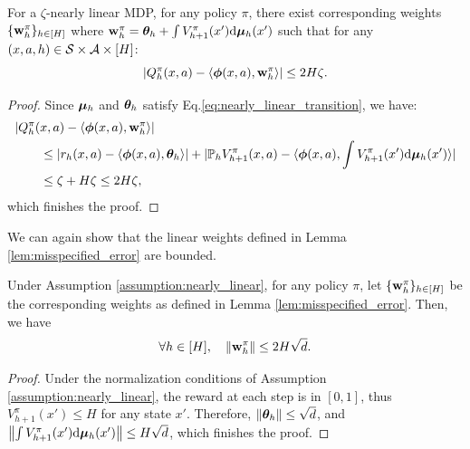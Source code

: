 \begin{lemma}\label{lem:misspecified_error}
For a $\zeta$-nearly linear MDP, for any policy $\pi$, there exist corresponding weights $\{\mathbf{w}^{\pi}_h\}_{h\in[H]}$ where $\mathbf{w}^{\pi}_h = \bm{\theta}_h  + \int V^\pi_{h+1}(x') \mathrm{d} \bm{\mu}_h (x')$ such that for any $(x, a, h) \in \mathcal{S}\times\mathcal{A}\times[H]$:
\begin{equation*}
|Q_h^\pi(x, a) - \langle\bm{\phi} (x, a),  \mathbf{w}^{\pi}_h\rangle| \le 2H\zeta.
\end{equation*}
\end{lemma}
\begin{proof} Since $\bm{\mu}_h$ and $\bm{\theta}_h$ satisfy Eq.\eqref{eq:nearly_linear_transition}, we have:
\begin{align*}
&|Q^\pi_h(x, a) -  \langle \bm{\phi}(x, a), \mathbf{w}^\pi_h\rangle| \\
& \qquad \le  |r_h(x, a) - \langle \bm{\phi}(x, a), \bm{\theta}_h\rangle| + |\mathbb{P}_h {V}^{\pi}_{h+1}(x, a) - \langle \bm{\phi}(x, a),\int V^\pi_{h+1}(x') \mathrm{d} \bm{\mu}_h (x') \rangle| \\
& \qquad \le  \zeta + H\zeta \le 2H\zeta , 
\end{align*}
which finishes the proof.
\end{proof}

We can again show that the linear weights defined in Lemma \ref{lem:misspecified_error} are bounded.
\begin{lemma} \label{lem:wn_policy_mis}
Under Assumption \ref{assumption:nearly_linear}, for any policy $\pi$, let $\{\mathbf{w}^{\pi}_h\}_{h\in[H]}$ be the corresponding weights as defined in Lemma \ref{lem:misspecified_error}.
Then, we have
\begin{equation*}
\forall h \in [H], \quad \left\|{\mathbf{w}^\pi_h}\right\| \le 2H\sqrt{d}.
\end{equation*}
\end{lemma}

\begin{proof}
Under the normalization conditions of Assumption \ref{assumption:nearly_linear}, the reward at each step is in $[0, 1]$, thus $V^\pi_{h+1}(x') \le H$ for any state $x'$. Therefore, $\left\|{\bm{\theta}_h}\right\| \le \sqrt{d}$, and $\left\|{\int V^\pi_{h+1}(x') \mathrm{d} \bm{\mu}_h (x')}\right\| \le H\sqrt{d}$, which finishes the proof.
\end{proof}


